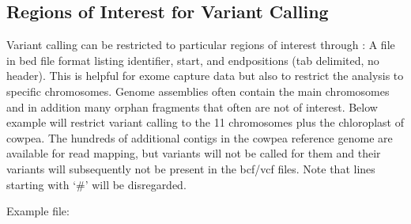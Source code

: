\documentclass[letterpaper,10pt,english]{sphinxmanual}
\begin{document}
\subsection{Regions of Interest for Variant Calling}
\label{\detokenize{index:regions-of-interest-for-variant-calling}}
Variant calling can be restricted to particular regions of interest through : A file in bed file format listing identifier, start\sphinxhyphen{}, and end\sphinxhyphen{}positions (tab delimited, no header). This is helpful for exome capture data but also to restrict the analysis to specific chromosomes. Genome assemblies often contain the main chromosomes and in addition many orphan fragments that often are not of interest.
Below example will restrict variant calling to the 11 chromosomes plus the chloroplast of cowpea. The hundreds of additional contigs in the cowpea reference genome are available for read mapping, but variants will not be called for them and their variants will subsequently not be present in the bcf/vcf files. Note that lines starting with ‘\#’ will be disregarded.

Example  file:

\begin{sphinxVerbatim}[commandchars=\\\{\}]
  
  
  
  
  
  
  
  
  
  
  
  
\end{sphinxVerbatim}
\end{document}
